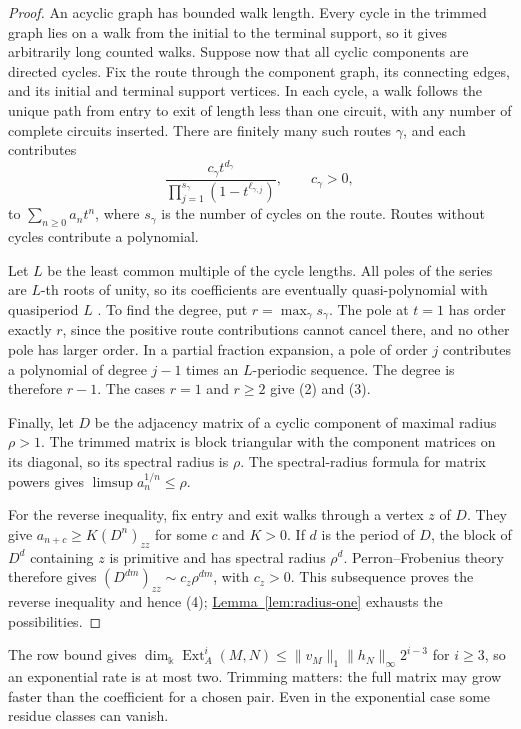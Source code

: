 \documentclass[reqno]{amsart}
\numberwithin{equation}{section}
\theoremstyle{definition}
\theoremstyle{remark}
\DeclareMathOperator{\Ext}{Ext}
\newcommand{\kk}{\Bbbk}
\newcommand{\kdim}{\dim_{\kk}}
\newcommand{\lemref}[1]{\hyperref[#1]{Lemma~\ref*{#1}}}
\begin{document}
\begin{proof}
An acyclic graph has bounded walk length. Every cycle in the trimmed graph lies on a walk from the initial to the terminal support, so it gives arbitrarily long counted walks. Suppose now that all cyclic components are directed cycles. Fix the route through the component graph, its connecting edges, and its initial and terminal support vertices. In each cycle, a walk follows the unique path from entry to exit of length less than one circuit, with any number of complete circuits inserted. There are finitely many such routes \(\gamma\), and each contributes
\[
 \frac{c_\gamma t^{d_\gamma}}{\prod_{j=1}^{s_\gamma}(1-t^{\ell_{\gamma,j}})},
 \qquad c_\gamma>0,
\]
to \(\sum_{n\ge0}a_nt^n\), where \(s_\gamma\) is the number of cycles on the route. Routes without cycles contribute a polynomial.

Let \(L\) be the least common multiple of the cycle lengths. All poles of the series are \(L\)-th roots of unity, so its coefficients are eventually quasi-polynomial with quasiperiod \(L\) \cite[Proposition~4.4.1]{StanleyEC1}. To find the degree, put \(r=\max_\gamma s_\gamma\). The pole at \(t=1\) has order exactly \(r\), since the positive route contributions cannot cancel there, and no other pole has larger order. In a partial fraction expansion, a pole of order \(j\) contributes a polynomial of degree \(j-1\) times an \(L\)-periodic sequence. The degree is therefore \(r-1\). The cases \(r=1\) and \(r\ge2\) give \textup{(2)} and \textup{(3)}.

Finally, let \(D\) be the adjacency matrix of a cyclic component of maximal radius \(\rho>1\). The trimmed matrix is block triangular with the component matrices on its diagonal, so its spectral radius is \(\rho\). The spectral-radius formula for matrix powers gives \(\limsup a_n^{1/n}\le\rho\).

For the reverse inequality, fix entry and exit walks through a vertex \(z\) of \(D\). They give \(a_{n+c}\ge K(D^n)_{zz}\) for some \(c\) and \(K>0\). If \(d\) is the period of \(D\), the block of \(D^d\) containing \(z\) is primitive and has spectral radius \(\rho^d\). Perron--Frobenius theory therefore gives \((D^{dm})_{zz}\sim c_z\rho^{dm}\), with \(c_z>0\). This subsequence proves the reverse inequality and hence \textup{(4)}; \lemref{lem:radius-one} exhausts the possibilities.
\end{proof}

The row bound gives \(\kdim\Ext_A^i(M,N)\le \lVert v_M\rVert_1\lVert h_N\rVert_\infty 2^{i-3}\) for \(i\ge3\), so an exponential rate is at most two. Trimming matters: the full matrix may grow faster than the coefficient for a chosen pair. Even in the exponential case some residue classes can vanish.
\end{document}
